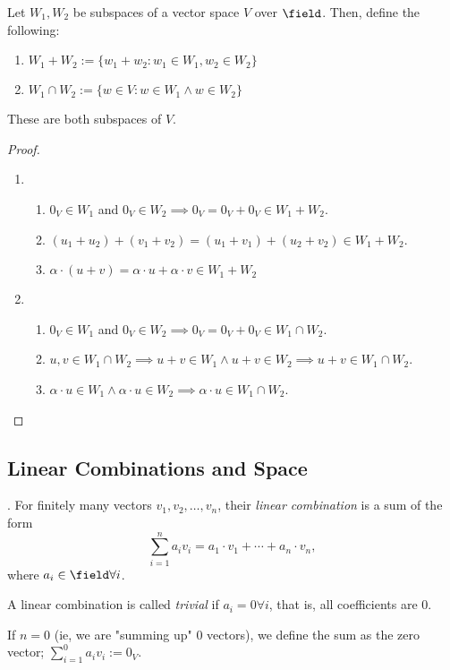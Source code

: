 \begin{proposition}
    Let $W_1, W_2$ be subspaces of a vector space $V$ over $\field$. Then, define the following:
    \begin{enumerate}
        \item $W_1 + W_2 := \{w_1 + w_2 : w_1 \in W_1, w_2 \in W_2\}$
        \item $W_1 \cap W_2:= \{w \in V : w \in W_1 \wedge w \in W_2\}$
    \end{enumerate}
    These are both subspaces of $V$.
\end{proposition}

\begin{proof}
    \begin{enumerate}
        \item \begin{enumerate}
            \item $0_V \in W_1$ and $0_V \in W_2 \implies 0_V = 0_V + 0_V \in W_1 + W_2$.
            \item $(u_1 +u_2) + (v_1 + v_2) = (u_1 + v_1) + (u_2 + v_2) \in W_1 + W_2$.
            \item $\alpha \cdot (u + v) = \alpha \cdot u + \alpha \cdot v \in W_1 + W_2$
        \end{enumerate}
        \item \begin{enumerate}
            \item $0_V \in W_1$ and $0_V \in W_2 \implies 0_V = 0_V + 0_V \in W_1 \cap W_2$.
            \item $u, v \in W_1 \cap W_2 \implies u + v \in W_1 \wedge u+v \in W_2 \implies u + v \in W_1 \cap W_2$.
            \item $\alpha \cdot u \in W_1 \wedge \alpha \cdot u \in W_2 \implies \alpha \cdot u \in W_1 \cap W_2$.
        \end{enumerate}
    \end{enumerate}
\end{proof}

\subsection{Linear Combinations and Space}

\begin{definition}
     . For finitely many vectors $v_1, v_2, \dots, v_n$, their \emph{linear combination} is a sum of the form \[
    \sum_{i=1}^{n} a_i v_i =  a_1 \cdot v_1 + \cdots + a_n \cdot v_n,
    \]
    where $a_i \in \field \forall i$.

    A linear combination is called \emph{trivial} if $a_i = 0 \forall i$, that is, all coefficients are $0$.

    If $n = 0$ (ie, we are "summing up" 0 vectors), we define the sum as the zero vector; $\sum_{i=1}^{0} a_i v_i := 0_V$.
\end{definition}